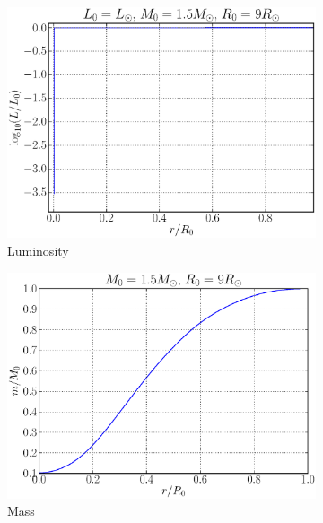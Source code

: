 \documentclass[a4paper, 11pt, english]{article}
\begin{document}
\begin{figure}[htpb]
	\begin{subfigure}{0.49\textwidth}
		\includegraphics[width=\linewidth]{figures/luminosity_1-5Msun.eps}
		\caption{Luminosity}
		\label{fig:luminosity_9Rsun}
	\end{subfigure}\hfill
	\begin{subfigure}{0.49\textwidth}
		\includegraphics[width=\linewidth]{figures/mass_1-5Msun.eps}
		\caption{Mass}
		\label{fig:mass_9Rsun}
	\end{subfigure}\hfill
	\vspace{0.35cm}
	\begin{subfigure}{0.49\textwidth}

\end{subfigure}
\end{figure}
\end{document}
